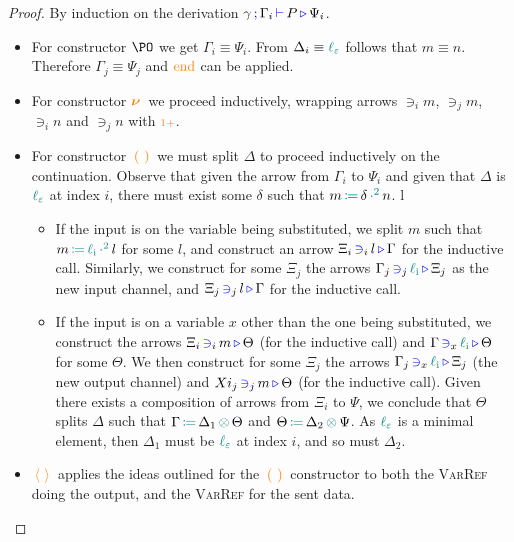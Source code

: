\begin{proof}[Proof]
  By induction on the derivation $\types{\gamma}{\Gamma_i}{P}{\Psi_i}$.
  \begin{itemize}
    \item
      For constructor $\PO$ we get $\Gamma_i \equiv \Psi_i$.
      From $\Delta_i \equiv \lz$ follows that $m \equiv n$.
      Therefore $\Gamma_j \equiv \Psi_j$ and $\constr{end}$ can be applied.

    \item
      For constructor $\new$ we proceed inductively, wrapping arrows $\ni_i m$, $\ni_j m$, $\ni_i n$ and $\ni_j n$ with $\suc$.
      
    \item
      For constructor $\recv{}{}$ we must split $\Delta$ to proceed inductively on the continuation.
      Observe that given the arrow from $\Gamma_i$ to $\Psi_i$ and given that $\Delta$ is $\lz$ at index $i$, there must exist some $\delta$ such that $\opsquared{m}{\delta}{n}$.
 l     \begin{itemize}
        \item
          If the input is on the variable being substituted, we split $m$ such that $\opsquared{m}{\li}{l}$ for some $l$, and construct an arrow $\containsusage{\Xi_i}{i}{l}{\Gamma}$ for the inductive call.
          Similarly, we construct for some $\Xi_j$ the arrows $\containsusage{\Gamma_j}{j}{\li}{\Xi_j}$ as the new input channel, and $\containsusage{\Xi_j}{j}{l}{\Gamma}$ for the inductive call.
        \item
          If the input is on a variable $x$ other than the one being substituted, we construct the arrows $\containsusage{\Xi_i}{i}{m}{\Theta}$ (for the inductive call) and $\containsusage{\Gamma}{x}{\li}{\Theta}$ for some $\Theta$.
          We then construct for some $\Xi_j$ the arrows $\containsusage{\Gamma_j}{x}{\li}{\Xi_j}$ (the new output channel) and $\containsusage{Xi_j}{j}{m}{\Theta}$ (for the inductive call).
          Given there exists a composition of arrows from $\Xi_i$ to $\Psi$, we conclude that $\Theta$ splits $\Delta$ such that $\opctx{\Gamma}{\Delta_1}{\Theta}$ and $\opctx{\Theta}{\Delta_2}{\Psi}$.
          As $\lz$ is a minimal element, then $\Delta_1$ must be $\lz$ at index $i$, and so must $\Delta_2$.
      \end{itemize}

    \item
      $\send{}{}$ applies the ideas outlined for the $\recv{}{}$ constructor to both the \textsc{VarRef} doing the output, and the \textsc{VarRef} for the sent data.


\end{itemize}
\end{proof}
